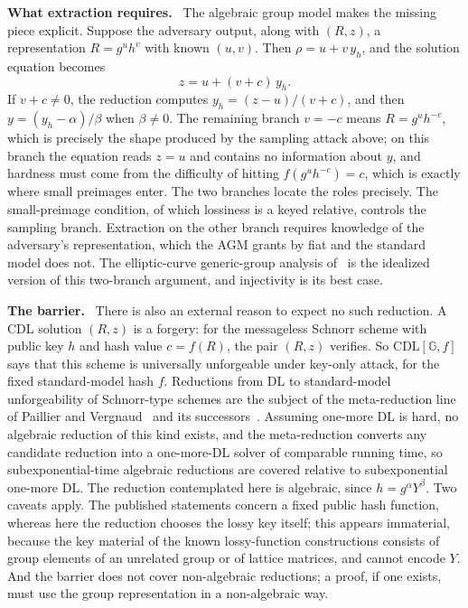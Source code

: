 \documentclass[11pt]{article}
\newcommand{\GG}{\mathbb{G}}
\newcommand{\heading}[1]{\medskip\noindent\textbf{#1}\ }
\begin{document}
\heading{What extraction requires.}
The algebraic group model makes the missing piece explicit. Suppose the adversary output, along with $(R,z)$, a representation $R = g^{u} h^{v}$ with known $(u,v)$. Then $\rho = u + v\, y_h$, and the solution equation becomes
$$z = u + (v + c)\, y_h .$$
If $v + c \ne 0$, the reduction computes $y_h = (z-u)/(v+c)$, and then $y = (y_h - \alpha)/\beta$ when $\beta \ne 0$. The remaining branch $v = -c$ means $R = g^{u} h^{-c}$, which is precisely the shape produced by the sampling attack above; on this branch the equation reads $z = u$ and contains no information about $y$, and hardness must come from the difficulty of hitting $f(g^{u}h^{-c}) = c$, which is exactly where small preimages enter. The two branches locate the roles precisely. The small-preimage condition, of which lossiness is a keyed relative, controls the sampling branch. Extraction on the other branch requires knowledge of the adversary's representation, which the AGM grants by fiat and the standard model does not. The elliptic-curve generic-group analysis of~\cite{CFOS25} is the idealized version of this two-branch argument, and injectivity is its best case.

\heading{The barrier.}
There is also an external reason to expect no such reduction. A CDL solution $(R,z)$ is a forgery: for the messageless Schnorr scheme with public key $h$ and hash value $c = f(R)$, the pair $(R,z)$ verifies. So $\mathrm{CDL}[\GG,f]$ says that this scheme is universally unforgeable under key-only attack, for the fixed standard-model hash $f$. Reductions from DL to standard-model unforgeability of Schnorr-type schemes are the subject of the meta-reduction line of Paillier and Vergnaud~\cite{PV05} and its successors~\cite{GBL08,Seu12,FJS19}. Assuming one-more DL is hard, no algebraic reduction of this kind exists, and the meta-reduction converts any candidate reduction into a one-more-DL solver of comparable running time, so subexponential-time algebraic reductions are covered relative to subexponential one-more DL. The reduction contemplated here is algebraic, since $h = g^{\alpha}Y^{\beta}$. Two caveats apply. The published statements concern a fixed public hash function, whereas here the reduction chooses the lossy key itself; this appears immaterial, because the key material of the known lossy-function constructions consists of group elements of an unrelated group or of lattice matrices, and cannot encode $Y$. And the barrier does not cover non-algebraic reductions; a proof, if one exists, must use the group representation in a non-algebraic way.
\end{document}
